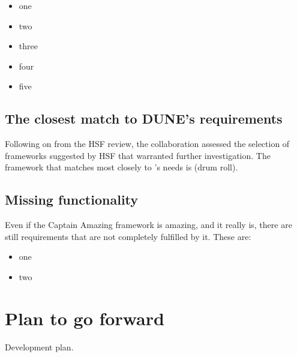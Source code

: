 \documentclass[../main-v1.tex]{subfiles}
\begin{document}
\begin{itemize}
    \item one
    \item two
    \item three
    \item four
    \item five
\end{itemize}

\subsection{The closest match to DUNE's requirements}

Following on from the HSF review, the  collaboration assessed the selection of frameworks suggested by HSF that warranted further investigation.  The framework that matches most closely to 's needs is (drum roll).

\subsection{Missing functionality }

Even if the Captain Amazing framework is amazing, and it really is, there are still requirements that are not completely fulfilled by it.  These are:

\begin{itemize}
    \item one
    \item two
\end{itemize}

\section{Plan to go forward }

Development plan.

%
\end{document}
